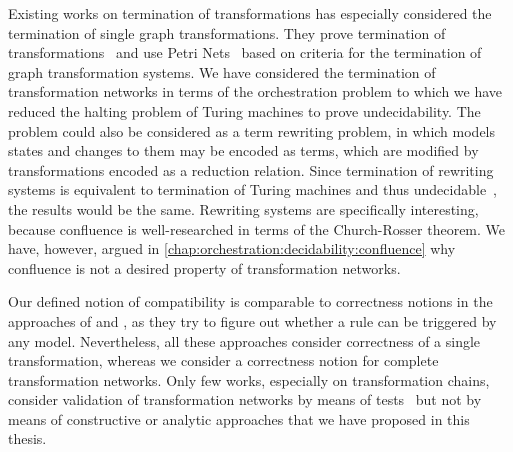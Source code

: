 Existing works on termination of transformations has especially considered the termination of single graph transformations.
They prove termination of transformations~\cite{ehrig2005termination-FASE} and use Petri Nets~\cite{varro2006termination-ICGT} based on criteria for the termination of graph transformation systems.
We have considered the termination of transformation networks in terms of the orchestration problem to which we have reduced the halting problem of Turing machines to prove undecidability.
The problem could also be considered as a term rewriting problem, in which models states and changes to them may be encoded as terms, which are modified by transformations encoded as a reduction relation.
Since termination of rewriting systems is equivalent to termination of Turing machines and thus undecidable~\cite{endrullis2011undecidabilityRewriting-IC}, the results would be the same.
Rewriting systems are specifically interesting, because confluence is well-researched in terms of the Church-Rosser theorem.
We have, however, argued in \autoref{chap:orchestration:decidability:confluence} why confluence is not a desired property of transformation networks.

Our defined notion of compatibility is comparable to correctness notions in the approaches of \textcite{cuadrado2017tse} and \textcite{cabot2010VerificationInvariants-JSS}, as they try to figure out whether a rule can be triggered by any model.
Nevertheless, all these approaches consider correctness of a single transformation, whereas we consider a correctness notion for complete transformation networks.
Only few works, especially on transformation chains, consider validation of transformation networks by means of tests~\cite{bauer2011combiningCoverageChains-ICMT} but not by means of constructive or analytic approaches that we have proposed in this thesis.





